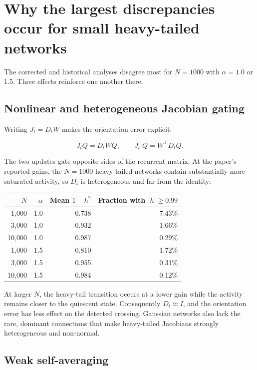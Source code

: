 \documentclass[11pt]{article}
\begin{document}
\section{Why the largest discrepancies occur for small heavy-tailed networks}

The corrected and historical analyses disagree most for $N=1000$ with
$\alpha=1.0$ or $1.5$. Three effects reinforce one another there.

\subsection{Nonlinear and heterogeneous Jacobian gating}

Writing $J_t=D_tW$ makes the orientation error explicit:

\[
J_tQ=D_tWQ,
\qquad
J_t^\top Q=W^\top D_tQ.
\]

The two updates gate opposite sides of the recurrent matrix. At the paper's
reported gains, the $N=1000$ heavy-tailed networks contain substantially more
saturated activity, so $D_t$ is heterogeneous and far from the identity:

\begin{center}
\begin{tabular}{rrrr}
\toprule
$N$ & $\alpha$ & Mean $1-h^2$ & Fraction with $|h|\geq0.99$ \\
\midrule
1,000 & 1.0 & 0.738 & 7.43\% \\
3,000 & 1.0 & 0.932 & 1.66\% \\
10,000 & 1.0 & 0.987 & 0.29\% \\
1,000 & 1.5 & 0.810 & 1.72\% \\
3,000 & 1.5 & 0.955 & 0.31\% \\
10,000 & 1.5 & 0.984 & 0.12\% \\
\bottomrule
\end{tabular}
\end{center}

At larger $N$, the heavy-tail transition occurs at a lower gain while the
activity remains closer to the quiescent state. Consequently $D_t\approx I$,
and the orientation error has less effect on the detected crossing. Gaussian
networks also lack the rare, dominant connections that make heavy-tailed
Jacobians strongly heterogeneous and non-normal.

\subsection{Weak self-averaging}
\end{document}

